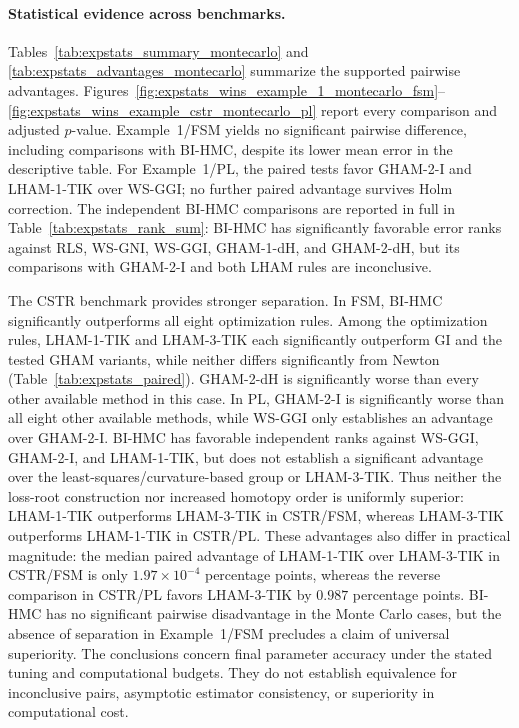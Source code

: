 \paragraph{Statistical evidence across benchmarks.}
Tables~\ref{tab:expstats_summary_montecarlo} and
\ref{tab:expstats_advantages_montecarlo} summarize the supported pairwise
advantages. Figures~\ref{fig:expstats_wins_example_1_montecarlo_fsm}--
\ref{fig:expstats_wins_example_cstr_montecarlo_pl} report every comparison
and adjusted $p$-value. Example~1/FSM yields no significant pairwise
difference, including comparisons with BI-HMC, despite its lower mean
error in the descriptive table. For Example~1/PL, the paired tests favor
GHAM-2-I and LHAM-1-TIK over WS-GGI; no further paired advantage survives
Holm correction. The independent BI-HMC comparisons are reported in full
in Table~\ref{tab:expstats_rank_sum}: BI-HMC has significantly favorable
error ranks against RLS, WS-GNI, WS-GGI, GHAM-1-dH, and GHAM-2-dH, but
its comparisons with GHAM-2-I and both LHAM rules are inconclusive.

The CSTR benchmark provides stronger separation. In FSM, BI-HMC
significantly outperforms all eight optimization rules. Among the
optimization rules, LHAM-1-TIK and LHAM-3-TIK each significantly outperform
GI and the tested GHAM variants, while neither differs significantly from
Newton (Table~\ref{tab:expstats_paired}). GHAM-2-dH is significantly worse than every other available method
in this case. In PL, GHAM-2-I is significantly worse than all eight other
available methods, while WS-GGI only establishes an advantage over
GHAM-2-I. BI-HMC has favorable independent ranks against WS-GGI,
GHAM-2-I, and LHAM-1-TIK, but does not establish a significant advantage
over the least-squares/curvature-based group or LHAM-3-TIK.
Thus neither the loss-root construction nor increased homotopy order is
uniformly superior: LHAM-1-TIK outperforms LHAM-3-TIK in CSTR/FSM,
whereas LHAM-3-TIK outperforms LHAM-1-TIK in CSTR/PL. These advantages
also differ in practical magnitude: the median paired advantage of
LHAM-1-TIK over LHAM-3-TIK in CSTR/FSM is only
$1.97\times10^{-4}$ percentage points, whereas the reverse comparison
in CSTR/PL favors LHAM-3-TIK by $0.987$ percentage points.
BI-HMC has no significant pairwise disadvantage in the Monte Carlo
cases, but the absence of separation in Example~1/FSM precludes a claim
of universal superiority. The conclusions concern final parameter accuracy under the stated tuning and computational
budgets. They do not establish equivalence for inconclusive pairs,
asymptotic estimator consistency, or superiority in computational cost.

